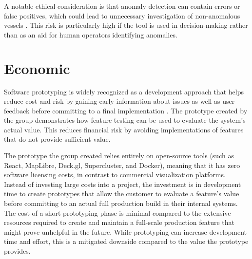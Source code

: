 A notable ethical consideration is that anomaly detection can contain errors or false positives, which could lead to unnecessary investigation of non-anomalous vessels \parencite{sele2024humanloop}. This risk is particularly high if the tool is used in decision-making rather than as an aid for human operators identifying anomalies.

\section{Economic}

Software prototyping is widely recognized as a development approach that helps reduce cost and risk by gaining early information about issues as well as user feedback before committing to a final implementation \parencite{openlearn_prototyping}.
The prototype created by the group demonstrates how feature testing can be used to evaluate the system's actual value. This reduces financial risk by avoiding implementations of features that do not provide sufficient value.

The prototype the group created relies entirely on open-source tools (such as React, MapLibre, Deck.gl, Supercluster, and Docker), meaning that it has zero software licensing costs, in contrast to commercial visualization platforms. Instead of investing large costs into a project, the investment is in development time to create prototypes that allow the customer to evaluate a feature's value before committing to an actual full production build in their internal systems. The cost of a short prototyping phase is minimal compared to the extensive resources required to create and maintain a full-scale production feature that might prove unhelpful in the future. While prototyping can increase development time and effort, this is a mitigated downside compared to the value the prototype provides.



